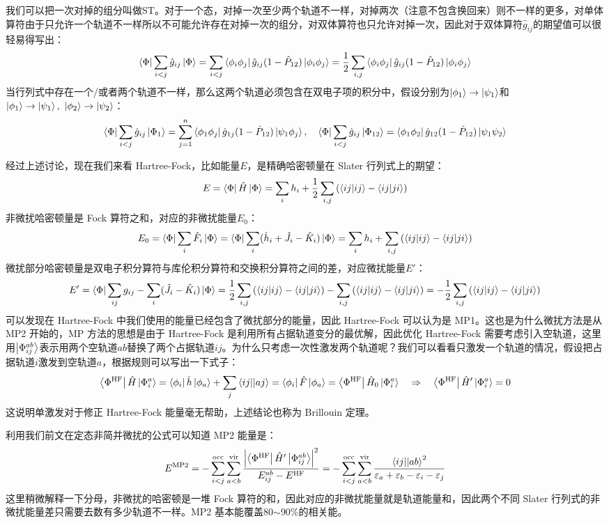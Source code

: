 我们可以把一次对掉的组分叫做ST。对于一个态，对掉一次至少两个轨道不一样，对掉两次（注意不包含换回来）则不一样的更多，对单体算符由于只允许一个轨道不一样所以不可能允许存在对掉一次的组分，对双体算符也只允许对掉一次，因此对于双体算符$\hat{g}_{ij}$的期望值可以很轻易得写出：
\[\bra{\Phi}\sum_{i<j}\hat{g}_{ij}\ket{\Phi}=\sum_{i<j}\bra{\phi_i\phi_j}\hat{g}_{ij}(1-\hat{P}_{12})\ket{\phi_i\phi_j}=\frac{1}{2}\sum_{i,j}\bra{\phi_i\phi_j}\hat{g}_{ij}(1-\hat{P}_{12})\ket{\phi_i\phi_j}\]
当行列式中存在一个/或者两个轨道不一样，那么这两个轨道必须包含在双电子项的积分中，假设分别为$\ket{\phi_1}\to\ket{\psi_1}$和$\ket{\phi_1}\to\ket{\psi_1}, \ \ket{\phi_2}\to\ket{\psi_2}$：
\[\bra{\Phi}\sum_{i<j}\hat{g}_{ij}\ket{\Phi_1}=\sum_{j=1}^n\bra{\phi_1\phi_j}\hat{g}_{1j}(1-\hat{P}_{12})\ket{\psi_1\phi_j}, \quad \bra{\Phi}\sum_{i<j}\hat{g}_{ij}\ket{\Phi_{12}}=\bra{\phi_1\phi_2}\hat{g}_{12}(1-\hat{P}_{12})\ket{\psi_1\psi_2}\]

经过上述讨论，现在我们来看 Hartree-Fock，比如能量$E$，是精确哈密顿量在 Slater 行列式上的期望：
\[E=\bra{\Phi}\hat{H}\ket{\Phi}=\sum_ih_i+\frac{1}{2}\sum_{i,j}\left(\bra{ij}\ket{ij}-\bra{ij}\ket{ji}\right)\]
非微扰哈密顿量是 Fock 算符之和，对应的非微扰能量$E_0$：
\[E_0=\bra{\Phi}\sum_i\hat{F}_i\ket{\Phi}=\bra{\Phi}\sum_i(\hat{h}_i+\hat{J}_i-\hat{K}_i)\ket{\Phi}=\sum_ih_i+\sum_{i,j}\left(\bra{ij}\ket{ij}-\bra{ij}\ket{ji}\right)\]
微扰部分哈密顿量是双电子积分算符与库伦积分算符和交换积分算符之间的差，对应微扰能量$E'$：
\[E'=\bra{\Phi}\sum_{ij}g_{ij}-\sum_i(\hat{J}_i-\hat{K}_i)\ket{\Phi}=\frac{1}{2}\sum_{i,j}\left(\bra{ij}\ket{ij}-\bra{ij}\ket{ji}\right)-\sum_{i,j}\left(\bra{ij}\ket{ij}-\bra{ij}\ket{ji}\right)=-\frac{1}{2}\sum_{i,j}\left(\bra{ij}\ket{ij}-\bra{ij}\ket{ji}\right)\]
可以发现在 Hartree-Fock 中我们使用的能量已经包含了微扰部分的能量，因此 Hartree-Fock 可以认为是 MP1。这也是为什么微扰方法是从 MP2 开始的，MP 方法的思想是由于 Hartree-Fock 是利用所有占据轨道变分的最优解，因此优化 Hartree-Fock 需要考虑引入空轨道，这里用$\ket{\Phi^{ab}_{ij}}$表示用两个空轨道$ab$替换了两个占据轨道$ij$。为什么只考虑一次性激发两个轨道呢？我们可以看看只激发一个轨道的情况，假设把占据轨道$i$激发到空轨道$a$，根据规则可以写出一下式子：
\[\bra{\Phi^{\rm{HF}}}\hat{H}\ket{\Phi^a_i}=\bra{\phi_i}\hat{h}\ket{\phi_a}+\sum_j\bra{ij}\ket{|aj}=\bra{\phi_i}\hat{F}\ket{\phi_a}=\bra{\Phi^{\rm{HF}}}\hat{H}_0\ket{\Phi^a_i} \quad \Rightarrow \quad \bra{\Phi^{\rm{HF}}}\hat{H}'\ket{\Phi^a_i}=0\]
这说明单激发对于修正 Hartree-Fock 能量毫无帮助，上述结论也称为 Brillouin 定理。

利用我们前文在定态非简并微扰的公式可以知道 MP2 能量是：
\[E^{\rm{MP2}}=-\sum_{i<j}^{\rm{occ}}\sum_{a<b}^{\rm{vir}}\frac{\left|\bra{\Phi^{\rm{HF}}}\hat{H}'\ket{\Phi^{ab}_{ij}}\right|^2}{E^{ab}_{ij}-E^{\rm{HF}}}=-\sum_{i<j}^{\rm{occ}}\sum_{a<b}^{\rm{vir}}\frac{\bra{ij}\ket{|ab}^2}{\varepsilon_a+\varepsilon_b-\varepsilon_i-\varepsilon_j}\]
这里稍微解释一下分母，非微扰的哈密顿是一堆 Fock 算符的和，因此对应的非微扰能量就是轨道能量和，因此两个不同 Slater 行列式的非微扰能量差只需要去数有多少轨道不一样。MP2 基本能覆盖80$\sim$90\%的相关能。


